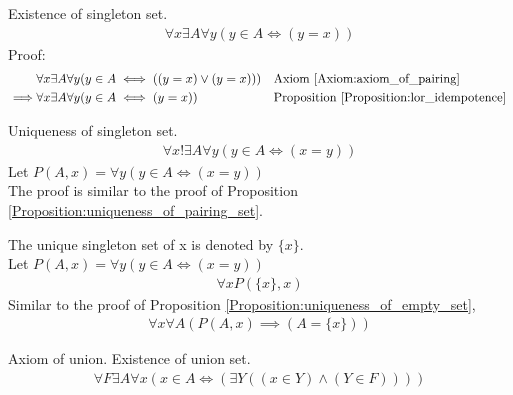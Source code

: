 \begin{prop}
\label{Proposition:existence_of_singleton_set}
Existence of singleton set.
\begin{align*}
\forall x \exists A \forall y (y \in A \iff (y=x))
\end{align*}
Proof:
\begin{align*}
& \forall x \exists A \forall y (y \in A \iff ((y=x) \lor (y=x)))
&& \text{Axiom \ref{Axiom:axiom_of_pairing}} \\
\implies & \forall x \exists A \forall y (y \in A \iff (y=x))
&& \text{Proposition \ref{Proposition:lor_idempotence}} \
\end{align*}
\end{prop}

\begin{prop}
\label{Proposition:uniqueness_of_singleton_set}
Uniqueness of singleton set.
\begin{align*}
\forall x !\exists A \forall y (y \in A \iff (x=y))
\end{align*}
Let $P(A,x) =  \forall y (y \in A \iff (x=y))$ \\
The proof is similar to the proof of Proposition \ref{Proposition:uniqueness_of_pairing_set}.
\end{prop}

\begin{defn}
\label{Definition:singleton_set}
The unique singleton set of x is denoted by $\{ x\}$. \\
Let $P(A,x) =  \forall y (y \in A \iff (x=y))$ \\
\begin{align*}
\forall x P(\{ x \} ,x)
\end{align*}
Similar to the proof of Proposition \ref{Proposition:uniqueness_of_empty_set},
\begin{align*}
\forall x \forall A (P(A,x) \implies (A=\{ x \}))
\end{align*}
\end{defn}

\begin{axm}
\label{Axiom:axiom_of_union}
Axiom of union. Existence of union set.
\begin{align*}
\forall F \exists A \forall x (x \in A \iff (\exists Y ((x \in Y) \land (Y \in F))))
\end{align*}
\end{axm}

